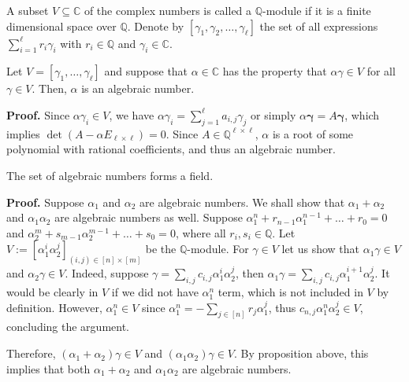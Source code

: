 \documentclass{template}
\begin{document}
\begin{definition}
    A subset $V \subseteq \mathbb{C}$ of the complex numbers is called a
    $\mathbb{Q}$-module if it is a finite dimensional space over $\mathbb{Q}$.
    Denote by $[\gamma_1,\gamma_2,\dots,\gamma_{\ell}]$ the set of all
    expressions $\sum_{i=1}^{\ell} r_i\gamma_i$ with $r_i \in \mathbb{Q}$ and
    $\gamma_i \in \mathbb{C}$.
\end{definition}

\begin{proposition}
    Let $V=[\gamma_1,\dots,\gamma_{\ell}]$ and suppose that $\alpha \in
    \mathbb{C}$ has the property that $\alpha\gamma \in V$ for all $\gamma \in
    V$. Then, $\alpha$ is an algebraic number.
\end{proposition}

\textbf{Proof.} Since $\alpha\gamma_i \in V$, we have $\alpha\gamma_i =
\sum_{j=1}^{\ell}a_{i,j}\gamma_j$ or simply $\alpha\boldsymbol{\gamma} =
A\boldsymbol{\gamma}$, which implies $\det(A - \alpha E_{\ell \times \ell}) =
0$. Since $A \in \mathbb{Q}^{\ell \times \ell}$, $\alpha$ is a root of some
polynomial with rational coefficients, and thus an algebraic number.

\begin{proposition}
    The set of algebraic numbers forms a field.
\end{proposition}

\textbf{Proof.} Suppose $\alpha_1$ and $\alpha_2$ are algebraic numbers. We
shall show that $\alpha_1+\alpha_2$ and $\alpha_1\alpha_2$ are algebraic numbers
as well. Suppose $\alpha_1^n + r_{n-1}\alpha_1^{n-1} + \dots + r_0 = 0$ and
$\alpha_2^m + s_{m-1}\alpha_2^{m-1} + \dots + s_0 = 0$, where all $r_i,s_i \in
\mathbb{Q}$. Let $V := [\alpha_1^i\alpha_2^j]_{(i,j) \in [n] \times [m]}$ be the
$\mathbb{Q}$-module. For $\gamma \in V$ let us show that $\alpha_1\gamma \in V$
and $\alpha_2\gamma \in V$. Indeed, suppose $\gamma =
\sum_{i,j}c_{i,j}\alpha_1^i\alpha_2^j$, then $\alpha_1\gamma =
\sum_{i,j}c_{i,j}\alpha_1^{i+1}\alpha_2^j$. It would be clearly in $V$ if we did
not have $\alpha_1^n$ term, which is not included in $V$ by definition. However,
$\alpha_1^n \in V$ since $\alpha_1^n = -\sum_{j \in [n]} r_j\alpha_1^j$, thus
$c_{n,j}\alpha_1^n\alpha_2^j \in V$, concluding the argument. 

Therefore, $(\alpha_1+\alpha_2)\gamma \in V$ and $(\alpha_1\alpha_2)\gamma \in
V$. By proposition above, this implies that both $\alpha_1+\alpha_2$ and 
$\alpha_1\alpha_2$ are algebraic numbers.
\end{document}
